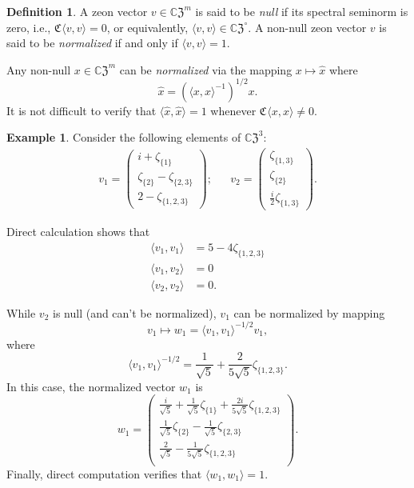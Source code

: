 \documentclass{article}
\theoremstyle{definition}
\newtheorem{definition}[theorem]{Definition}
\newtheorem{example}[theorem]{Example}
\newcommand{\zco}{\mathfrak{C}\mspace{1mu}}
\newcommand{\CZ}{\mathbb{C}\mathfrak{Z}}
\numberwithin{equation}{section}
\begin{document}
\begin{definition}
A zeon vector $v\in{\CZ}^m$ is said to be {\em null} if its spectral seminorm is zero, i.e., $\zco\langle v, v\rangle = 0$, or equivalently, $\langle v,v\rangle\in{\CZ}^\circ$.  A non-null zeon vector $v$ is said to be {\em normalized} if and only if $\langle v,v\rangle =1$.  
\end{definition}

Any non-null $x\in{\CZ}^m$ can be {\em normalized} via the mapping $x\mapsto \hat{x}$ where \begin{equation*}
\hat{x}=(\langle x, x\rangle^{-1})^{1/2} x.
\end{equation*}
It is not difficult to verify that $\langle \hat{x}, \hat{x}\rangle=1$ whenever $\zco \langle x,x\rangle\ne 0$.  


\begin{example}
Consider the following elements of ${\CZ}^3$:
\begin{align*}
v_1=\begin{pmatrix} i+\zeta _{\{1\}}\\
 \zeta _{\{2\}}-\zeta _{\{2,3\}}\\
 2-\zeta _{\{1,2,3\}}
 \end{pmatrix}; &&
v_2=\begin{pmatrix}
 \zeta _{\{1,3\}}\\
 \zeta _{\{2\}}\\
 \frac{i}{2}  \zeta _{\{1,3\}}\end{pmatrix}.
\end{align*}

Direct calculation shows that \begin{align*}
\langle v_1,v_1\rangle&=5-4 \zeta _{\{1,2,3\}}\\
\langle v_1,v_2\rangle&=0\\
\langle v_2,v_2\rangle&=0.
\end{align*}

While $v_2$ is null (and can't be normalized), $v_1$ can be normalized by mapping \begin{equation*}
v_1\mapsto w_1=\langle v_1, v_1\rangle^{-1/2} v_1,
\end{equation*}
where \begin{equation*}
\langle v_1,v_1\rangle^{-1/2}=\frac{1}{\sqrt{5}}+\frac{2}{5 \sqrt{5}}\zeta _{\{1,2,3\}}.
\end{equation*}
In this case, the normalized vector $w_1$ is \begin{equation*}
w_1=\left(
\begin{array}{c}
\frac{i}{\sqrt{5}}+\frac{1}{\sqrt{5}}\zeta _{\{1\}}+ \frac{2 i}{5 \sqrt{5}}\zeta _{\{1,2,3\}}\\
 \frac{1}{\sqrt{5}}\zeta _{\{2\}}-\frac{1}{\sqrt{5}}\zeta _{\{2,3\}} \\
 \frac{2}{\sqrt{5}}-\frac{1}{5 \sqrt{5}}\zeta _{\{1,2,3\}} \\
\end{array}
\right).
\end{equation*}
Finally, direct computation verifies that $\langle w_1, w_1\rangle  =1$.
\end{example}
\end{document}
